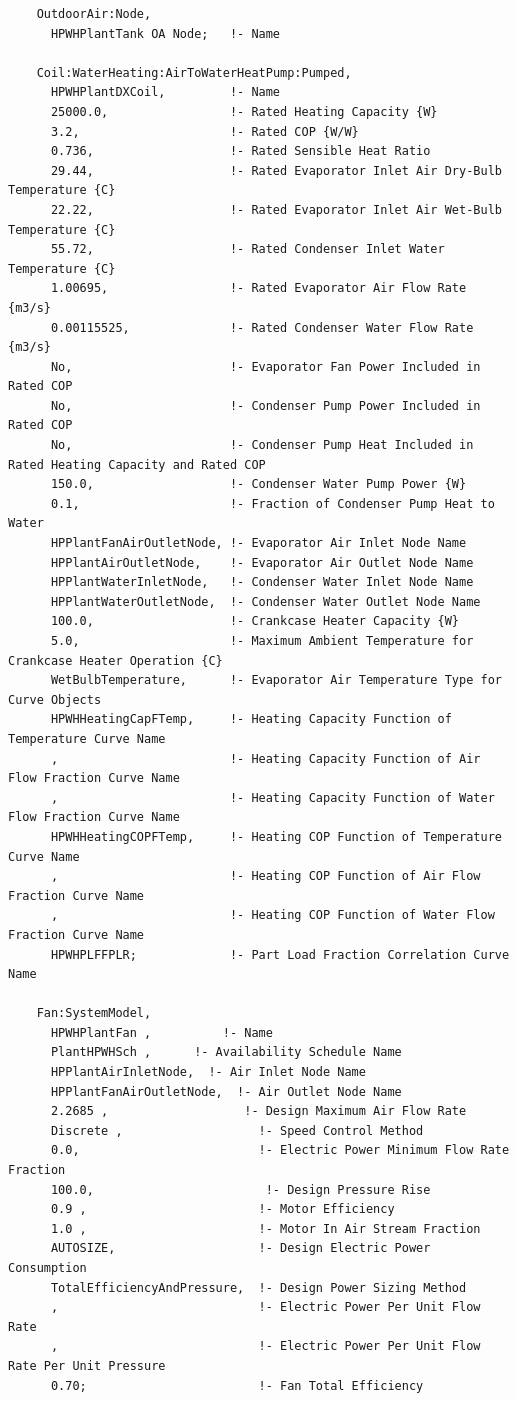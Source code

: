 \begin{lstlisting}
    OutdoorAir:Node,
      HPWHPlantTank OA Node;   !- Name

    Coil:WaterHeating:AirToWaterHeatPump:Pumped,
      HPWHPlantDXCoil,         !- Name
      25000.0,                 !- Rated Heating Capacity {W}
      3.2,                     !- Rated COP {W/W}
      0.736,                   !- Rated Sensible Heat Ratio
      29.44,                   !- Rated Evaporator Inlet Air Dry-Bulb Temperature {C}
      22.22,                   !- Rated Evaporator Inlet Air Wet-Bulb Temperature {C}
      55.72,                   !- Rated Condenser Inlet Water Temperature {C}
      1.00695,                 !- Rated Evaporator Air Flow Rate {m3/s}
      0.00115525,              !- Rated Condenser Water Flow Rate {m3/s}
      No,                      !- Evaporator Fan Power Included in Rated COP
      No,                      !- Condenser Pump Power Included in Rated COP
      No,                      !- Condenser Pump Heat Included in Rated Heating Capacity and Rated COP
      150.0,                   !- Condenser Water Pump Power {W}
      0.1,                     !- Fraction of Condenser Pump Heat to Water
      HPPlantFanAirOutletNode, !- Evaporator Air Inlet Node Name
      HPPlantAirOutletNode,    !- Evaporator Air Outlet Node Name
      HPPlantWaterInletNode,   !- Condenser Water Inlet Node Name
      HPPlantWaterOutletNode,  !- Condenser Water Outlet Node Name
      100.0,                   !- Crankcase Heater Capacity {W}
      5.0,                     !- Maximum Ambient Temperature for Crankcase Heater Operation {C}
      WetBulbTemperature,      !- Evaporator Air Temperature Type for Curve Objects
      HPWHHeatingCapFTemp,     !- Heating Capacity Function of Temperature Curve Name
      ,                        !- Heating Capacity Function of Air Flow Fraction Curve Name
      ,                        !- Heating Capacity Function of Water Flow Fraction Curve Name
      HPWHHeatingCOPFTemp,     !- Heating COP Function of Temperature Curve Name
      ,                        !- Heating COP Function of Air Flow Fraction Curve Name
      ,                        !- Heating COP Function of Water Flow Fraction Curve Name
      HPWHPLFFPLR;             !- Part Load Fraction Correlation Curve Name

    Fan:SystemModel,
      HPWHPlantFan ,          !- Name
      PlantHPWHSch ,      !- Availability Schedule Name
      HPPlantAirInletNode,  !- Air Inlet Node Name
      HPPlantFanAirOutletNode,  !- Air Outlet Node Name
      2.2685 ,                   !- Design Maximum Air Flow Rate
      Discrete ,                   !- Speed Control Method
      0.0,                         !- Electric Power Minimum Flow Rate Fraction
      100.0,                        !- Design Pressure Rise
      0.9 ,                        !- Motor Efficiency
      1.0 ,                        !- Motor In Air Stream Fraction
      AUTOSIZE,                    !- Design Electric Power Consumption
      TotalEfficiencyAndPressure,  !- Design Power Sizing Method
      ,                            !- Electric Power Per Unit Flow Rate
      ,                            !- Electric Power Per Unit Flow Rate Per Unit Pressure
      0.70;                        !- Fan Total Efficiency
\end{lstlisting}

